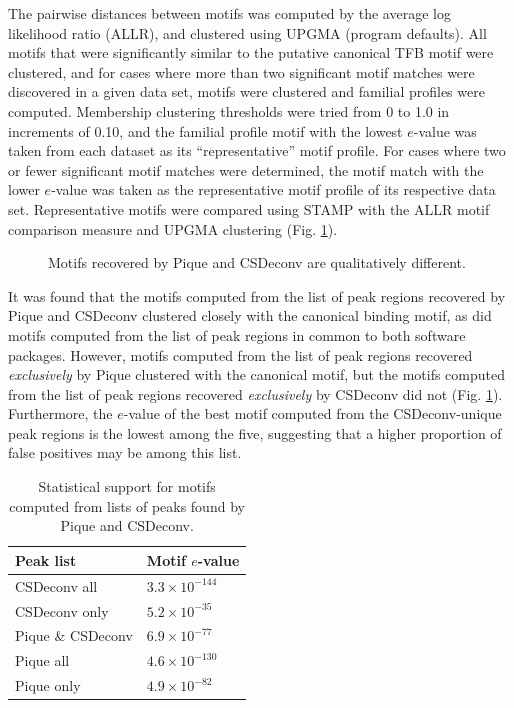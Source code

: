 \documentclass{bioinfo}
\begin{document}
The pairwise distances between motifs was computed by the average log
likelihood ratio (ALLR), and clustered using UPGMA (program
defaults). All motifs that were significantly similar to the putative
canonical TFB motif were clustered, and for cases where more than two
significant motif matches were discovered in a given data set, motifs
were clustered and familial profiles were computed. Membership
clustering thresholds were tried from 0 to 1.0 in increments of 0.10,
and the familial profile motif with the lowest $e$-value was taken
from each dataset as its ``representative'' motif profile.  For cases
where two or fewer significant motif matches were determined, the
motif match with the lower $e$-value was taken as the representative
motif profile of its respective data set. Representative motifs were
compared using STAMP \cite{STAMP} with the ALLR motif comparison
measure and UPGMA clustering (Fig. \ref{motif-tree}).

\begin{figure}
  \begin{center}
    {}
  \end{center}
  \caption{Motifs recovered by Pique and CSDeconv are qualitatively
    different.}\label{motif-tree}
\end{figure}

It was found that the motifs computed from the list of peak regions
recovered by Pique and CSDeconv clustered closely with the canonical
binding motif, as did motifs computed from the list of peak regions in
common to both software packages. However, motifs computed from the
list of peak regions recovered {\em exclusively} by Pique clustered
with the canonical motif, but the motifs computed from the list of
peak regions recovered {\em exclusively} by CSDeconv did not
(Fig. \ref{motif-tree}). Furthermore, the $e$-value of the best motif
computed from the CSDeconv-unique peak regions is the lowest among the
five, suggesting that a higher proportion of false positives may be
among this list.

\begin{table}
  \begin{center}
    \begin{tabular}{ l l }
      Peak list & Motif $e$-value \\
      \hline
      CSDeconv all      & $3.3 \times 10^{-144}$ \\
      CSDeconv only     & $5.2 \times 10^{-35}$ \\
      Pique \& CSDeconv & $6.9 \times 10^{-77}$ \\
      Pique all         & $4.6 \times 10^{-130}$ \\
      Pique only        & $4.9 \times 10^{-82}$ \\
    \end{tabular}
  \end{center}
  \caption{Statistical support for motifs computed from lists of peaks 
    found by Pique and CSDeconv.}
\end{table}
\end{document}
